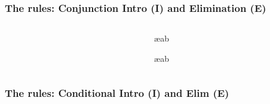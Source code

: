 \begin{frame}
  \frametitle{The rules: Conjunction Intro (\eand I) and Elimination (\eand E)}
\begin{columns}
  \begin{column}{3cm}
  \begin{fitchproof}
     
  \end{fitchproof}
\end{column}
\begin{column}{3cm}
  \begin{fitchproof}
     \ae{ab}
  \end{fitchproof}
  \begin{fitchproof}
     \ae{ab}
  \end{fitchproof}
\end{column}
\end{columns}
\end{frame}

\begin{frame}
  \frametitle{The rules: Conditional Intro (\eif I) and Elim (\eif E)}
\begin{columns}
  \begin{column}{3cm}
    \begin{fitchproof}
      \open
       
      \ellipsesline
      \close
       
    \end{fitchproof}
  \end{column}
  \begin{column}{3cm}
    \begin{fitchproof}
       
    \end{fitchproof}
  \end{column}
\end{columns}
\end{frame}

